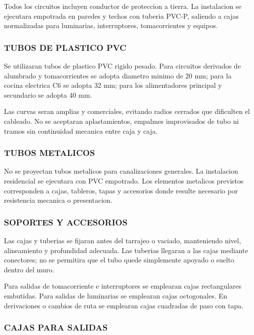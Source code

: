 Todos los circuitos incluyen conductor de proteccion a tierra. La instalacion se ejecutara empotrada en paredes y techos con tuberia PVC-P, saliendo a cajas normalizadas para luminarias, interruptores, tomacorrientes y equipos.

\subsubsection{TUBOS DE PLASTICO PVC}

Se utilizaran tubos de plastico PVC rigido pesado. Para circuitos derivados de alumbrado y tomacorrientes se adopta diametro minimo de 20 mm; para la cocina electrica C6 se adopta 32 mm; para los alimentadores principal y secundario se adopta 40 mm.

Las curvas seran amplias y comerciales, evitando radios cerrados que dificulten el cableado. No se aceptaran aplastamientos, empalmes improvisados de tubo ni tramos sin continuidad mecanica entre caja y caja.

\subsubsection{TUBOS METALICOS}

No se proyectan tubos metalicos para canalizaciones generales. La instalacion residencial se ejecutara con PVC empotrado. Los elementos metalicos previstos corresponden a cajas, tableros, tapas y accesorios donde resulte necesario por resistencia mecanica o presentacion.

\subsubsection{SOPORTES Y ACCESORIOS}

Las cajas y tuberias se fijaran antes del tarrajeo o vaciado, manteniendo nivel, alineamiento y profundidad adecuada. Las tuberias llegaran a las cajas mediante conectores; no se permitira que el tubo quede simplemente apoyado o suelto dentro del muro.

Para salidas de tomacorriente e interruptores se emplearan cajas rectangulares embutidas. Para salidas de luminarias se emplearan cajas octogonales. En derivaciones o cambios de ruta se emplearan cajas cuadradas de paso con tapa.

\subsubsection{CAJAS PARA SALIDAS}

